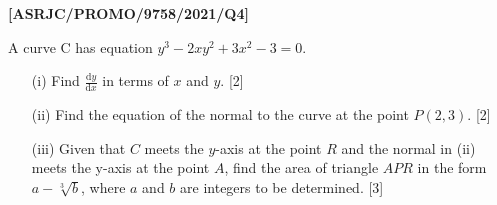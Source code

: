 \item \textbf{{[}ASRJC/PROMO/9758/2021/Q4{]} }

A curve C has equation $y^{3}-2xy^{2}+3x^{2}-3=0$. 
\begin{enumerate}
\item[(i)]  Find $\frac{\text{d}y}{\text{d}x}$ in terms of $x$ and $y$. \hfill{}{[}2{]}
\item[(ii)]  Find the equation of the normal to the curve at the point $P(2,3)$.
\hfill{}{[}2{]}
\item[(iii)]  Given that $C$ meets the $y$-axis at the point $R$ and the normal
in (ii) meets the y-axis at the point $A$, find the area of triangle
$APR$ in the form $a-\sqrt[3]{b}$, where $a$ and $b$ are integers
to be determined. \hfill{}{[}3{]}
\end{enumerate}